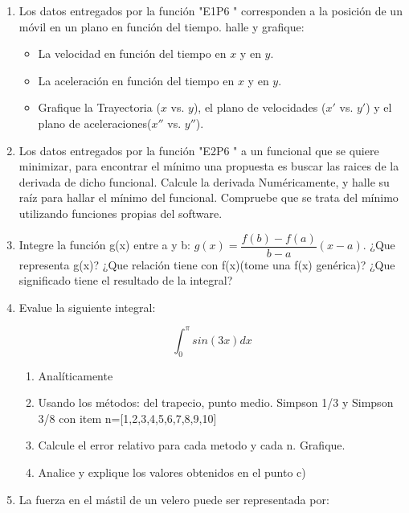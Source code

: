 \documentclass[a4paper,11pt]{article}
\theoremstyle{mytheor}
\begin{document}
\begin{enumerate}
    \item Los datos entregados por la función "E1P6 " corresponden a la posición de un móvil en un plano en función del tiempo. halle y grafique:
    \begin{itemize}
    	\item La velocidad en función del tiempo en $x$ y en $y$.
    	\item La aceleración en función del tiempo en $x$ y en $y$.
    	\item Grafique la Trayectoria ($x$ vs. $y$), el plano de velocidades ($x'$ vs. $y'$) y el 					plano de aceleraciones($x''$ vs. $y''$).
    \end{itemize}
    
    
    \item Los datos entregados por la función "E2P6 " a un funcional que se quiere minimizar, para encontrar el mínimo una propuesta es buscar las raices de la derivada de dicho funcional. Calcule la derivada Numéricamente, y halle su raíz para hallar el mínimo del funcional. Compruebe que se trata del mínimo utilizando funciones propias del software.


	\item Integre la función g(x) entre a y b: $g(x)=\dfrac{f(b)-f(a)}{b-a}(x-a)$. ¿Que representa g(x)? ¿Que relación tiene con f(x)(tome una f(x) genérica)? ¿Que significado tiene el resultado de la integral?

	\item Evalue la siguiente integral:

\begin{equation*}
    \int_{0}^{\pi}sin(3x)dx
\end{equation*}

\begin{enumerate}[label=\alph*)]
    \item Analíticamente
    \item Usando los métodos: del trapecio, punto medio. Simpson 1/3 y Simpson 3/8 con item n=[1,2,3,4,5,6,7,8,9,10]
    \item Calcule el error relativo para cada metodo y cada n. Grafique.
    \item Analice y explique los valores obtenidos en el punto c)
\end{enumerate} 




\item La fuerza en el mástil de un velero puede ser representada por:


\end{enumerate}
\end{document}
